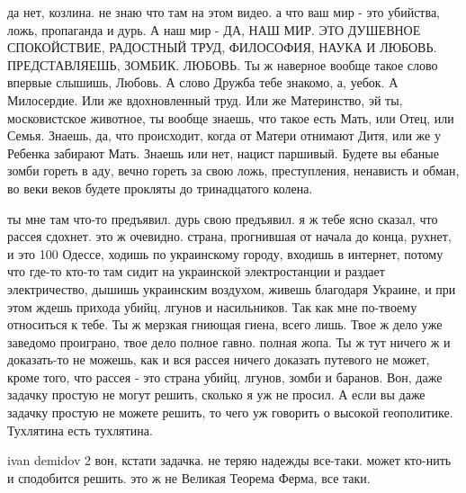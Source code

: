 да нет, козлина. не знаю что там на этом видео. а что ваш мир - это убийства,
ложь, пропаганда и дурь. А наш мир - ДА, НАШ МИР. ЭТО ДУШЕВНОЕ СПОКОЙСТВИЕ,
РАДОСТНЫЙ ТРУД, ФИЛОСОФИЯ, НАУКА И ЛЮБОВЬ. ПРЕДСТАВЛЯЕШЬ, ЗОМБИК. ЛЮБОВЬ. Ты ж
наверное вообще такое слово впервые слышишь, Любовь. А слово Дружба тебе
знакомо, а, уебок. А Милосердие. Или же вдохновленный труд. Или же Материнство,
эй ты, московистское животное, ты вообще знаешь, что такое есть Мать, или Отец,
или Семья. Знаешь, да, что происходит, когда от Матери отнимают Дитя, или же у
Ребенка забирают Мать. Знаешь или нет, нацист паршивый. Будете вы ебаные зомби
гореть в аду, вечно гореть за свою ложь, преступления, ненависть и обман, во
веки веков будете прокляты до тринадцатого колена.

ты мне там что-то предъявил. дурь свою предъявил. я ж тебе ясно сказал, что
рассея сдохнет. это ж очевидно. страна, прогнившая от начала до конца, рухнет,
и это 100 %
Одессе, ходишь по украинскому городу, входишь в интернет, потому что где-то
кто-то там сидит на украинской электростанции и раздает электричество, дышишь
украинским воздухом, живешь благодаря Украине, и при этом ждешь прихода убийц,
лгунов и насильников. Так как мне по-твоему относиться к тебе. Ты ж мерзкая
гниющая гиена, всего лишь. Твое ж дело уже заведомо проиграно, твое дело полное
гавно. полная жопа. Ты ж тут ничего ж и доказать-то не можешь, как и вся рассея
ничего доказать путевого не может, кроме того, что рассея - это страна убийц,
лгунов, зомби и баранов. Вон, даже задачку простую не могут решить, сколько я
уж не просил. А если вы даже задачку простую не можете решить, то чего уж
говорить о высокой геополитике. Тухлятина есть тухлятина.

ivan demidov 2 вон, кстати задачка. не теряю надежды все-таки. может кто-нить и
сподобится решить. это ж не Великая Теорема Ферма, все таки.

